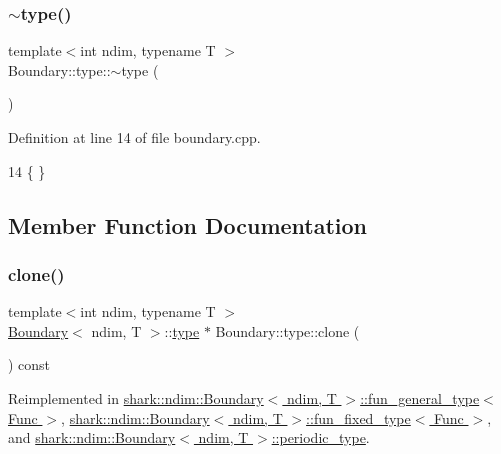 \subsubsection{\texorpdfstring{$\sim$type()}{~type()}}
{\footnotesize\ttfamily template$<$int ndim, typename T $>$ \\
Boundary\+::type\+::$\sim$type (\begin{DoxyParamCaption}{ }\end{DoxyParamCaption})\hspace{0.3cm}{\ttfamily [virtual]}}



Definition at line 14 of file boundary.\+cpp.


\begin{DoxyCode}
14 \{ \}
\end{DoxyCode}


\subsection{Member Function Documentation}
\hypertarget{classshark_1_1ndim_1_1_boundary_1_1type_a5651988ce3a6c229009d3fa849e820dc}{}\label{classshark_1_1ndim_1_1_boundary_1_1type_a5651988ce3a6c229009d3fa849e820dc} 
\subsubsection{\texorpdfstring{clone()}{clone()}}
{\footnotesize\ttfamily template$<$int ndim, typename T $>$ \\
\hyperlink{classshark_1_1ndim_1_1_boundary}{Boundary}$<$ ndim, T $>$\+::\hyperlink{classshark_1_1ndim_1_1_boundary_1_1type}{type} $\ast$ Boundary\+::type\+::clone (\begin{DoxyParamCaption}{ }\end{DoxyParamCaption}) const\hspace{0.3cm}{\ttfamily [virtual]}}



Reimplemented in \hyperlink{classshark_1_1ndim_1_1_boundary_1_1fun__general__type_a2a2ebd25aa8dcb4960c28db87680e7c6}{shark\+::ndim\+::\+Boundary$<$ ndim, T $>$\+::fun\+\_\+general\+\_\+type$<$ Func $>$}, \hyperlink{classshark_1_1ndim_1_1_boundary_1_1fun__fixed__type_a54ad8e702f2f3ff9403d43bfb7b38411}{shark\+::ndim\+::\+Boundary$<$ ndim, T $>$\+::fun\+\_\+fixed\+\_\+type$<$ Func $>$}, and \hyperlink{classshark_1_1ndim_1_1_boundary_1_1periodic__type_a54904c3d305d26abe8cc8f4b85d9d7e0}{shark\+::ndim\+::\+Boundary$<$ ndim, T $>$\+::periodic\+\_\+type}.



